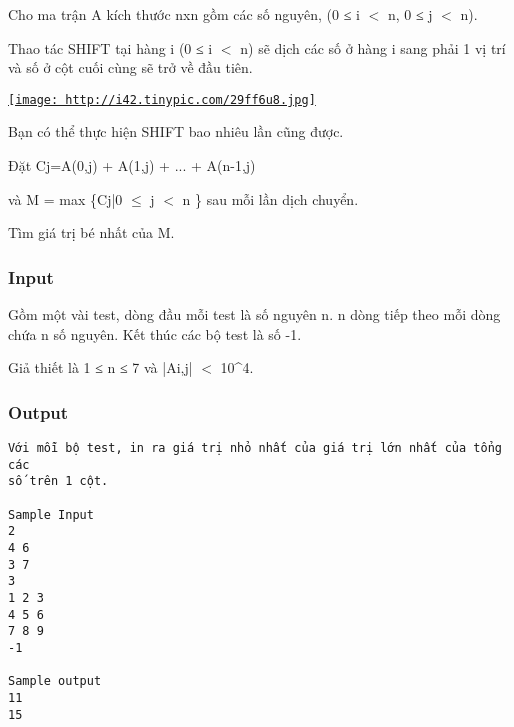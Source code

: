 

Cho ma trận A kích thước nxn gồm các số nguyên, (0 ≤ i $<$ n, 0 ≤ j $<$ n).

Thao tác SHIFT tại hàng i (0 ≤ i $<$ n) sẽ dịch các số ở hàng i sang phải 1 vị trí và số ở cột cuối cùng sẽ trở về đầu tiên.

\href{http://tinypic.com}{
\texttt{[image: http://i42.tinypic.com/29ff6u8.jpg]}}

Bạn có thể thực hiện SHIFT bao nhiêu lần cũng được.




Đặt Cj=A(0,j) + A(1,j) + ... + A(n-1,j)

và M = max \{Cj|0 $\le$ j $<$ n \} sau mỗi lần dịch chuyển.

Tìm giá trị bé nhất của M.

\subsubsection{Input}

Gồm một vài test, dòng đầu mỗi test là số nguyên n. n dòng tiếp theo mỗi dòng chứa n số nguyên. Kết thúc các bộ test là số -1.

Giả thiết là 1 ≤ n ≤ 7 và |Ai,j| $<$ 10^4.

\subsubsection{Output}
\begin{verbatim}
Với mỗi bộ test, in ra giá trị nhỏ nhất của giá trị lớn nhất của tổng các
số trên 1 cột.

​Sample Input
2
4 6
3 7
3
1 2 3
4 5 6
7 8 9
-1

Sample output
11
15\end{verbatim}
